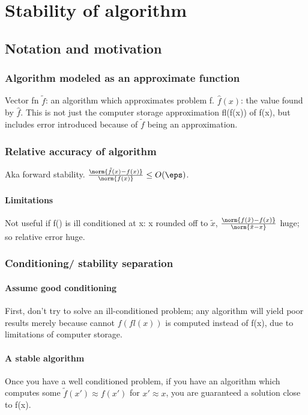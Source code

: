 \documentclass[oneside, article]{memoir}
\begin{document}
\chapter{Stability of algorithm}
\section{Notation and motivation}
\subsection{Algorithm modeled as an approximate function}
Vector fn $\tilde{f}$: an algorithm which approximates problem f. $\hat{f}(x)$: the value found by $\hat{f}$. This is not just the computer storage approximation fl(f(x)) of f(x), but includes error introduced because of $\tilde{f}$ being an approximation.

\subsection{Relative accuracy of algorithm}
Aka forward stability. \chk $\frac{\norm{\tilde{f}(x) - f(x)}}{\norm{f(x)}} \leq O(\eps)$.

\subsubsection{Limitations}
Not useful if f() is ill conditioned at x: x rounded off to $\tilde{x}$, $\frac{\norm{f(\tilde{x}) -f(x)}}{\norm{\tilde{x} - x}}$ huge; so relative error huge.

\subsection{Conditioning/ stability separation}
\subsubsection{Assume good conditioning}
First, don't try to solve an ill-conditioned problem; any algorithm will yield poor results merely because cannot $f(fl(x))$ is computed instead of f(x), due to limitations of computer storage.

\subsubsection{A stable algorithm}
Once you have a well conditioned problem, if you have an algorithm which computes some $\tilde{f}(x') \approx f(x')$ for $x' \approx x$, you are guaranteed a solution close to f(x).
\end{document}

